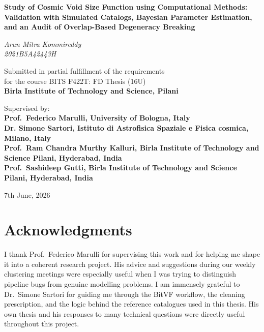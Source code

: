 \documentclass[12pt]{report}
\begin{document}
\hypersetup{pageanchor=false}

\begin{titlepage}
    \centering
    \vspace*{2cm}
    {\Large\bfseries Study of Cosmic Void Size Function using Computational Methods:\\[6pt]
    Validation with Simulated Catalogs, Bayesian Parameter Estimation,\\[4pt]
    and an Audit of Overlap-Based Degeneracy Breaking \par}
    \vspace{1.5cm}
    {\Large\itshape Arun Mitra Kommireddy\\ 2021B5A42443H \par}
    \vfill
    {\large Submitted in partial fulfillment of the requirements\\
    for the course BITS F422T: FD Thesis (16U)\\[6pt]
    \bfseries Birla Institute of Technology and Science, Pilani\par}
    \vspace{1cm}
    {\large Supervised by:\\\bfseries Prof.\ Federico Marulli, University of Bologna, Italy\\ Dr. Simone Sartori, Istituto di Astrofisica Spaziale e Fisica cosmica, Milano, Italy\\ Prof.\ Ram Chandra Murthy Kalluri, Birla Institute of Technology and Science Pilani, Hyderabad, India\\ Prof.\ Sashideep Gutti, Birla Institute of Technology and Science Pilani, Hyderabad, India\par}

    \vfill
    {\large 7th June, 2026\par}
\end{titlepage}

\chapter*{Acknowledgments}

I thank Prof.\ Federico Marulli for supervising this work and for helping me shape it into a coherent research project. His advice and suggestions during our weekly clustering meetings were especially useful when I was trying to distinguish pipeline bugs from genuine modelling problems. I am immensely grateful to Dr.\ Simone Sartori for guiding me through the BitVF workflow, the cleaning prescription, and the logic behind the reference catalogues used in this thesis. His own thesis and his responses to many technical questions were directly useful throughout this project.
\end{document}
